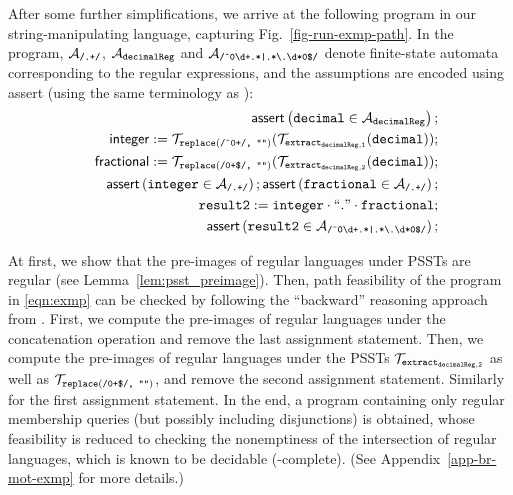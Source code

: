 After some further simplifications, we arrive at the following program
in our string-manipulating language, capturing Fig.~\ref{fig-run-exmp-path}.  In
the program, $\mathcal{A}_{\scriptsize\mbox{\tt/.+/}}$, $\mathcal{A}_{\tt decimalReg}$
and
$\mathcal{A}_{\scriptsize\mbox{\tt /\^{}0\textbackslash
    d+.*|.*{\scriptsize\textbackslash}.\textbackslash d*0\$/}}$ denote
finite-state automata corresponding to the regular expressions, and
the assumptions are encoded using \textsf{assert} (using the same
terminology as \cite{CHL+19}):
%
\begin{eqnarray}\label{eqn:exmp}
& & \textsf{assert}\left(\tt decimal \in \mathcal{A}_{decimalReg}\right);\nonumber \\
& & \sf integer  := \tt  \mathcal{T}_{\tt replace(\mbox{\scriptsize \tt /\^{}0+/, ""})}(\mathcal{T}_{\tt extract_{decimalReg,1}}(decimal));\nonumber \\
& & \sf fractional  := \tt  \mathcal{T}_{\scriptsize\tt replace(\mbox{\tt /0+\$/, ""})}(\mathcal{T}_{\tt extract_{decimalReg,2}}(decimal)); \\
&&  \textsf{assert}\left(\tt integer \in \mathcal{A}_{\scriptsize\mbox{\tt/.+/}}\right); 
\textsf{assert}\left(\tt fractional \in \mathcal{A}_{\scriptsize\mbox{\tt/.+/}}\right); \nonumber\\
 && \tt result2 := integer \cdot ``." \cdot fractional; \nonumber\\
 && \textsf{assert}\left(\tt result2 \in \mathcal{A}_{\scriptsize\mbox{\tt /\^{}0\textbackslash d+.*|.*{\scriptsize\textbackslash}.\textbackslash d*0\$/}}\right); \nonumber
\end{eqnarray}


At first, we show that the pre-images of regular languages under PSSTs are regular (see Lemma~\ref{lem:psst_preimage}).
Then, path feasibility of the program in \eqref{eqn:exmp} can be checked by following the ``backward'' reasoning approach from \cite{CHL+19}.
First, we compute the pre-images of regular languages under the concatenation operation and remove the last assignment statement. Then, we compute the pre-images of regular languages under the PSSTs $\mathcal{T}_{\tt extract_{decimalReg,2}}$ as well as $\mathcal{T}_{\scriptsize\tt replace(\mbox{\tt /0+\$/, ""})}$, and remove the second assignment statement. Similarly for the first assignment statement. In the end, a program containing only regular membership queries (but possibly including disjunctions) is obtained, whose feasibility is reduced to checking the nonemptiness of the intersection of regular languages, which is known to be decidable (\pspace-complete). (See Appendix~\ref{app-br-mot-exmp} for more details.)
